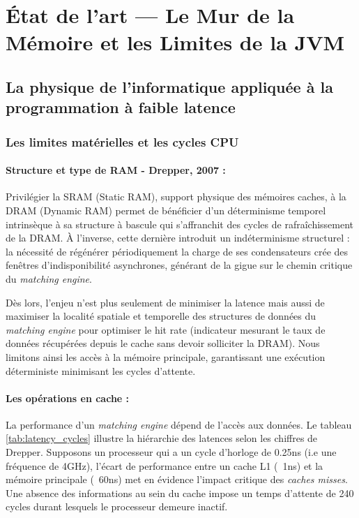 \section{État de l'art — Le Mur de la Mémoire et les Limites de la JVM}

\subsection{La physique de l'informatique appliquée à la programmation à faible latence}

\subsubsection{Les limites matérielles et les cycles CPU}

\paragraph{Structure et type de RAM - Drepper, 2007 : }

Privilégier la SRAM (Static RAM), support physique des mémoires caches, à la DRAM (Dynamic RAM) permet de bénéficier d'un déterminisme temporel intrinsèque à sa structure à bascule qui s'affranchit des cycles de rafraîchissement de la DRAM. À l'inverse, cette dernière introduit un indéterminisme structurel : la nécessité de régénérer périodiquement la charge de ses condensateurs crée des fenêtres d'indisponibilité asynchrones, générant de la gigue sur le chemin critique du \textit{matching engine}.

Dès lors, l'enjeu n'est plus seulement de minimiser la latence mais aussi de maximiser la localité spatiale et temporelle des structures de données du \textit{matching engine} pour optimiser le hit rate (indicateur mesurant le taux de données récupérées depuis le cache sans devoir solliciter la DRAM). Nous limitons ainsi les accès à la mémoire principale, garantissant une exécution déterministe minimisant les cycles d'attente.

\paragraph{Les opérations en cache : }

La performance d'un \textit{matching engine} dépend de l'accès aux données. Le tableau \ref{tab:latency_cycles} illustre la hiérarchie des latences selon les chiffres de Drepper. Supposons un processeur qui a un cycle d'horloge de 0.25ns (i.e une fréquence de 4GHz), l'écart de performance entre un cache L1 (~1ns) et la mémoire principale (~60ns) met en évidence l'impact critique des \textit{caches misses}. Une absence des informations au sein du cache impose un temps d'attente de 240 cycles durant lesquels le processeur demeure inactif.


